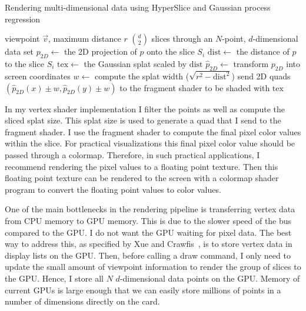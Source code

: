 \begin{algorithm}
  \caption{Rendering multi-dimensional data using HyperSlice and Gaussian process regression}
  \label{algo:full}
  \begin{algorithmic}
  \Require viewpoint $\vec{v}$, maximum distance $r$
  \Ensure ${d \choose 2}$ slices through an $N$-point, $d$-dimensional data set
   
      \State $p_{2D} \gets$ the 2D projection of $p$ onto the slice $S_i$\label{al:line:slicedist}\;
      \State $\mathrm{dist} \gets$ the distance of $p$ to the slice $S_i$\label{al:line:disteq}\;
        \label{al:line:filterif}
        \State $\mathrm{tex} \gets$ the Gaussian splat scaled by $\mathrm{dist}$\label{al:line:splatscale}\;
        \State $\hat{p}_{2D} \gets$ transform $p_{2D}$ into screen coordinates\label{al:line:screenpoint}\;
        \State $w \gets$ compute the splat width ($\sqrt{r^2-\mathrm{dist}^2}$)\label{al:line:splatsize}\;
        \State send 2D quads $(\hat{p}_{2D}(x) \pm w, \hat{p}_{2D}(y) \pm w)$ to the 
          fragment shader to be shaded with $\mathrm{tex}$\;
      \EndIf
    \EndFor
  \EndFor
  \end{algorithmic}
\end{algorithm}

In my vertex shader implementation I filter the points as well as compute
the sliced splat size.  This splat size is used to generate a quad that I
send to the fragment shader.  I use the fragment shader to compute the 
final pixel color values within the slice.
For practical visualizations this final pixel color value should be passed
through a colormap.  Therefore, in such practical applications, I recommend
rendering the pixel values to a floating point texture. Then this floating
point texture can be rendered to the screen with a colormap shader program
to convert the floating point values to color values.

One of the main bottlenecks in the rendering pipeline is transferring
vertex data from CPU memory to GPU memory.  This is due to the slower
speed of the bus compared to the GPU. I do not want the GPU waiting
for pixel data.  The best way to address this, as specified by Xue and
Crawfis~\cite{Xue:2003}, is to store vertex data in display lists on the
GPU.  Then, before calling a draw command, I only need to update the 
small amount of viewpoint information to
render the group of slices to the GPU. Hence, I store all $N$ $d$-dimensional
data points on the GPU. Memory of current GPUs is large enough that we can easily 
store millions of points in a number of dimensions directly on the card.

